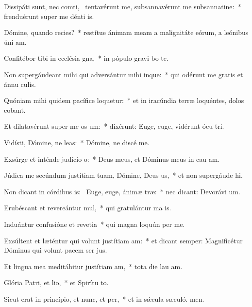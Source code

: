 \item Dissipáti sunt, nec comti,~\pscross{} tentavérunt me, subsannavérunt me subsannatine:~* frenduérunt super me dénti is.
\item Dómine, quando recies?~* restítue ánimam meam a malignitáte eórum, a leónibus úni am.
\item Confitébor tibi in ecclésia gna,~* in pópulo gravi bo te.
\item Non supergáudeant mihi qui adversántur mihi inque:~* qui odérunt me gratis et ánnu culis.
\item Quóniam mihi quidem pacífice loquetur:~* et in iracúndia terræ loquéntes, dolos cobant.
\item Et dilatavérunt super me os um:~* dixérunt: Euge, euge, vidérunt ócu tri.
\item Vidísti, Dómine, ne leas:~* Dómine, ne discé  me.
\item Exsúrge et inténde judício o:~* Deus meus, et Dóminus meus in cau am.
\item Júdica me secúndum justítiam tuam, Dómine, Deus us,~* et non supergáude hi.
\item Non dicant in córdibus is:~\pscross{} Euge, euge, ánimæ træ:~* nec dicant: Devorávi um.
\item Erubéscant et revereántur mul,~* qui gratulántur ma is.
\item Induántur confusióne et revetia~* qui magna loquún per me.
\item Exsúltent et læténtur qui volunt justítiam am:~* et dicant semper: Magnificétur Dóminus qui volunt pacem ser jus.
\item Et lingua mea meditábitur justítiam am,~* tota die lau am.
\item Glória Patri, et lio,~* et Spirítu to.
\item Sicut erat in princípio, et nunc, et per,~* et in sǽcula sæculó. men.
